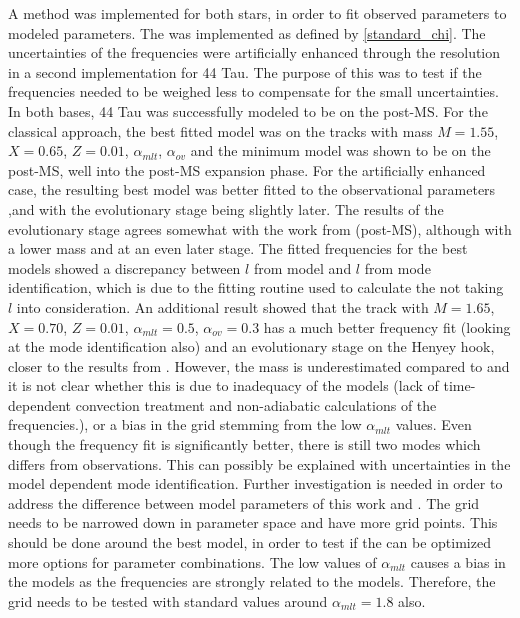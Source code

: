 A \chis method was implemented for both stars, in order to fit observed parameters to modeled parameters.  The \chis was implemented as defined by \eqref{standard_chi}. The uncertainties of the frequencies were artificially enhanced through the resolution in a second \chis implementation for 44 Tau. The purpose of this was to test if the frequencies needed to be weighed less to compensate for the small uncertainties. In both bases, 44 Tau was successfully modeled to be on the post-MS. For the classical \chis approach, the best fitted model was on the tracks with mass $M=1.55$\msun, $X=0.65$, $Z=0.01$, $\alpha_{mlt}$, $\alpha_{ov}$ and the minimum \chis model was shown to be on the post-MS,  well into the post-MS expansion phase. For the artificially enhanced case, the resulting best model was better fitted to the observational parameters \teff,\lum and \logg with the evolutionary stage being slightly later. The results of the evolutionary stage agrees somewhat with the work from \citet{lenz2010delta}(post-MS), although with a lower mass and at an even later stage. The fitted frequencies for the best models showed a discrepancy between $l$ from model and $l$ from mode identification, which is due to the fitting routine used to calculate the \chis not taking $l$ into consideration. An additional result showed that the track with $M=1.65$\msun, $X=0.70$, $Z=0.01$, $\alpha_{mlt}= 0.5$, $\alpha_{ov}=0.3$ has a much better frequency fit (looking at the mode identification also) and an evolutionary stage on the Henyey hook, closer to the results from \citet{lenz2010delta}. However, the mass is underestimated compared to \citet{lenz2010delta} and it is not clear whether this is due to inadequacy of the models (lack of time-dependent convection treatment and non-adiabatic calculations of the frequencies.), or a bias in the grid stemming from the low $\alpha_{mlt}$ values. Even though the frequency fit is significantly better, there is still two modes which differs from observations. This can possibly be explained with uncertainties in the model dependent mode identification.  
Further investigation is needed in order to address the difference between model parameters of this work and \citet{lenz2010delta}. The grid needs to be narrowed down in parameter space and have more grid points. This should be done around the best model, in order to test if the \chis can be optimized more options for parameter combinations. The low values of $\alpha_{mlt}$ causes a bias in the models as the frequencies are strongly related to the models. Therefore, the grid needs to be tested with standard values around $\alpha_{mlt}=1.8$ also. 

